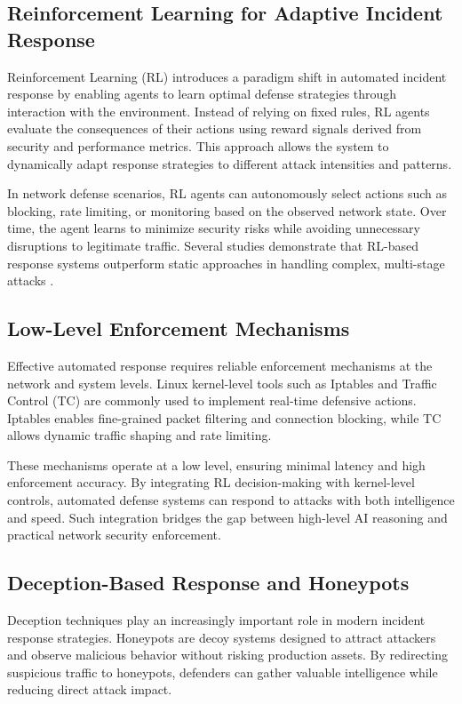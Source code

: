 \documentclass[12pt,a4paper]{report}
\begin{document}
\subsection{Reinforcement Learning for Adaptive Incident Response}

Reinforcement Learning (RL) introduces a paradigm shift in automated incident response by enabling agents to learn optimal defense strategies through interaction with the environment.
Instead of relying on fixed rules, RL agents evaluate the consequences of their actions using reward signals derived from security and performance metrics.
This approach allows the system to dynamically adapt response strategies to different attack intensities and patterns.

In network defense scenarios, RL agents can autonomously select actions such as blocking, rate limiting, or monitoring based on the observed network state.
Over time, the agent learns to minimize security risks while avoiding unnecessary disruptions to legitimate traffic.
Several studies demonstrate that RL-based response systems outperform static approaches in handling complex, multi-stage attacks \cite{lopez2020application,nguyen2021deep}.

\subsection{Low-Level Enforcement Mechanisms}

Effective automated response requires reliable enforcement mechanisms at the network and system levels.
Linux kernel-level tools such as Iptables and Traffic Control (TC) are commonly used to implement real-time defensive actions.
Iptables enables fine-grained packet filtering and connection blocking, while TC allows dynamic traffic shaping and rate limiting.

These mechanisms operate at a low level, ensuring minimal latency and high enforcement accuracy.
By integrating RL decision-making with kernel-level controls, automated defense systems can respond to attacks with both intelligence and speed.
Such integration bridges the gap between high-level AI reasoning and practical network security enforcement.

\subsection{Deception-Based Response and Honeypots}

Deception techniques play an increasingly important role in modern incident response strategies.
Honeypots are decoy systems designed to attract attackers and observe malicious behavior without risking production assets.
By redirecting suspicious traffic to honeypots, defenders can gather valuable intelligence while reducing direct attack impact.
\end{document}
